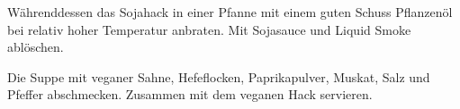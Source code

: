 \begin{recipeDP}
{        \step Währenddessen das Sojahack in einer Pfanne mit einem guten Schuss Pflanzenöl bei relativ hoher Temperatur anbraten.
        Mit Sojasauce und Liquid Smoke ablöschen.

        \step Die Suppe mit veganer Sahne, Hefeflocken, Paprikapulver, Muskat, Salz und Pfeffer abschmecken.
        Zusammen mit dem veganen Hack servieren.
    }



\end{recipeDP}